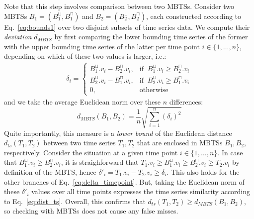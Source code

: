 Note that this step involves comparison between two MBTSs. Consider two MBTSs $B_1 = (B_1^{\sqcup}, B_1^{\sqcap})$ and $B_2 = (B_2^{\sqcup}, B_2^{\sqcap})$, each constructed according to Eq.~\ref{eq:bounds1} over two disjoint subsets of time series data. We compute their {\em deviation} $d_{MBTS}$ by first comparing the lower bounding time series of the former with the upper bounding time series of the latter per time point $i \in \{ 1, \dots, n \}$, depending on which of these two values is larger, i.e.:
\begin{equation}
 \begin{split}
  \delta_i = \begin{cases}
	B_1^{\sqcup}.v_i - B_2^{\sqcap}.v_i, & \text{if} \;\; B_1^{\sqcup}.v_i \geq B_2^{\sqcap}.v_i \\
	B_2^{\sqcup}.v_i - B_1^{\sqcap}.v_i, & \text{if} \;\; B_2^{\sqcup}.v_i \geq B_1^{\sqcap}.v_i \\
	0, & \text{otherwise}
	  \end{cases}
 \end{split}
 \label{eq:delta_timepoint}
\end{equation}
\noindent and we take the average Euclidean norm over these $n$ differences:
\begin{equation} \label{eq:dist_mbts}
d_{MBTS}(B_1, B_2) = \frac{1}{n}\sqrt{\displaystyle \sum_{i=1}^{n}({\delta}_i)^2}
\end{equation}
Quite importantly, this measure is a {\em lower bound} of the Euclidean distance $d_{ts}(T_1, T_2)$  between two time series $T_1, T_2$ that are enclosed in MBTSs $B_1, B_2$, respectively. Consider the situation at a given time point $i \in \{ 1, \dots, n \}$. In case that $B_1^{\sqcup}.v_i \geq B_2^{\sqcap}.v_i$, it is straighforward that $T_1.v_i \geq B_1^{\sqcup}.v_i \geq B_2^{\sqcap}.v_i \geq T_2.v_i$ by definition of the MBTS, hence ${\delta}'_i = T_1.v_i - T_2.v_i \geq {\delta}_i$. This also holds for the other branches of Eq.~\ref{eq:delta_timepoint}. But, taking the Euclidean norm of these ${\delta}'_i$ values over all time points expresses the time series similarity according to Eq.~\ref{eq:dist_ts}. Overall, this confirms that $d_{ts}(T_1, T_2) \geq d_{MBTS}(B_1, B_2)$, so checking with MBTSs does not cause any false misses.
   

